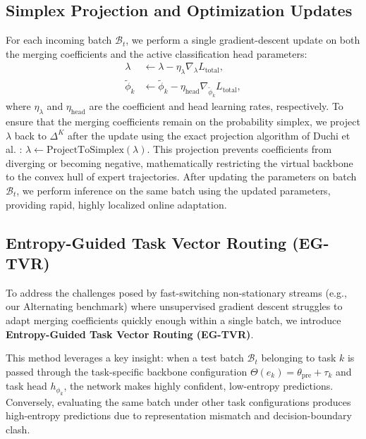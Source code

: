 \documentclass{article}
\theoremstyle{plain}
\theoremstyle{definition}
\theoremstyle{remark}
\begin{document}
\subsection{Simplex Projection and Optimization Updates}
For each incoming batch $\mathcal{B}_t$, we perform a single gradient-descent update on both the merging coefficients and the active classification head parameters:
\begin{align}
    \lambda &\leftarrow \lambda - \eta_{\lambda} \nabla_{\lambda} L_{\text{total}}, \\
    \tilde{\phi}_k &\leftarrow \tilde{\phi}_k - \eta_{\text{head}} \nabla_{\tilde{\phi}_k} L_{\text{total}},
\end{align}
where $\eta_{\lambda}$ and $\eta_{\text{head}}$ are the coefficient and head learning rates, respectively. To ensure that the merging coefficients remain on the probability simplex, we project $\lambda$ back to $\Delta^K$ after the update using the exact projection algorithm of Duchi et al. \cite{liang2020shot}: $\lambda \leftarrow \text{ProjectToSimplex}(\lambda)$.
This projection prevents coefficients from diverging or becoming negative, mathematically restricting the virtual backbone to the convex hull of expert trajectories. After updating the parameters on batch $\mathcal{B}_t$, we perform inference on the same batch using the updated parameters, providing rapid, highly localized online adaptation.

\subsection{Entropy-Guided Task Vector Routing (EG-TVR)}
To address the challenges posed by fast-switching non-stationary streams (e.g., our Alternating benchmark) where unsupervised gradient descent struggles to adapt merging coefficients quickly enough within a single batch, we introduce \textbf{Entropy-Guided Task Vector Routing (EG-TVR)}. 

This method leverages a key insight: when a test batch $\mathcal{B}_t$ belonging to task $k$ is passed through the task-specific backbone configuration $\Theta(e_k) = \theta_{\text{pre}} + \tau_k$ and task head $h_{\phi_k}$, the network makes highly confident, low-entropy predictions. Conversely, evaluating the same batch under other task configurations produces high-entropy predictions due to representation mismatch and decision-boundary clash.
\end{document}
